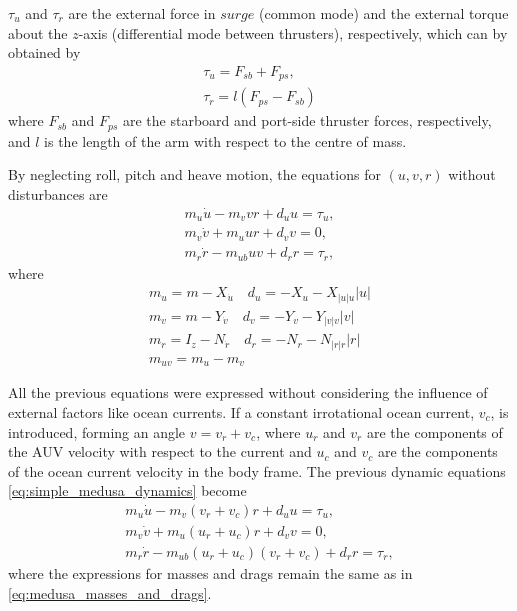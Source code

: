 \par $\tau_u$ and $\tau_r$ are the external force in $surge$ (common mode) and the external torque about the $z$-axis (differential mode between thrusters), respectively, which can by obtained by 
\begin{equation}
    \begin{gathered}
        \tau_u = F_{sb} + F_{ps}, \\
        \tau_r = l(F_{ps} - F_{sb})
    \end{gathered}
    \label{eq:simple_medusa_kinematics}
\end{equation}
where $F_{sb}$ and $F_{ps}$ are the starboard and port-side thruster forces, respectively, and $l$ is the length of the arm with respect to the centre of mass.
\par By neglecting roll, pitch and heave motion, the equations for $(u,v,r)$ without disturbances are
\begin{equation} 
    \begin{gathered}
        m_u\dot{u} - m_v v r + d_u u = \tau_u, \\
        m_v \dot{v} + m_u u r + d_v v = 0, \\
        m_r \dot{r} - m_{ub} u v + d_r r = \tau_r,
    \end{gathered}
    \label{eq:simple_medusa_dynamics}
\end{equation}
where
\begin{equation}
    \begin{gathered}
        m_u = m - X_{\dot{u}} \quad d_u = - X_u - X_{|u|u} |u| \\
        m_v = m - Y_{\dot{v}} \quad d_v = - Y_v - Y_{|v|v}|v| \\
        m_r = I_z - N_{\dot{r}} \quad d_r = - N_r - N_{|r|r}|r| \\
        m_{uv} = m_u - m_v
    \end{gathered}
    \label{eq:medusa_masses_and_drags}
\end{equation}


\par All the previous equations were expressed without considering the influence of external factors like ocean currents. If a constant irrotational ocean current, $v_c$, is introduced, forming an angle $v = v_r+v_c$, where $u_r$ and $v_r$ are the components of the \acs{AUV} velocity with respect to the current and $u_c$ and $v_c$ are the components of the ocean current velocity in the body frame.
The previous dynamic equations \eqref{eq:simple_medusa_dynamics} become
\begin{equation}
    \begin{gathered}
        m_u\dot{u}-m_v(v_r+v_c)r+d_u u=\tau_u, \\
        m_v\dot{v}+m_u(u_r+u_c) r + d_v v=0, \\
        m_r\dot{r}-m_{ub}(u_r+u_c)(v_r+v_c)+d_r r=\tau_r,
    \end{gathered}
\end{equation}
where the expressions for masses and drags remain the same as in \eqref{eq:medusa_masses_and_drags}.


